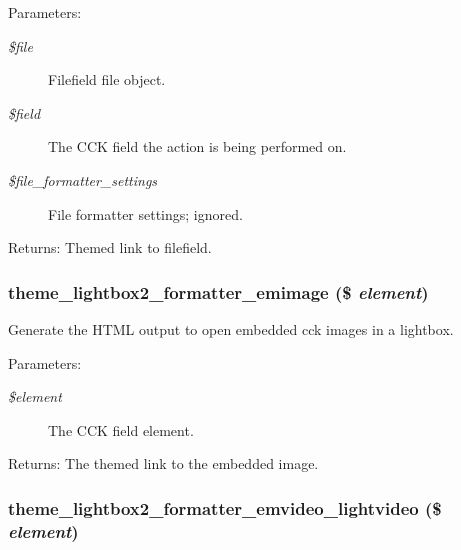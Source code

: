 \begin{Desc}
\item[Parameters:]
\begin{description}
\item[{\em \$file}]Filefield file object. \item[{\em \$field}]The CCK field the action is being performed on. \item[{\em \$file\_\-formatter\_\-settings}]File formatter settings; ignored. \end{description}
\end{Desc}
\begin{Desc}
\item[Returns:]Themed link to filefield. \end{Desc}
\hypertarget{lightbox2_8formatter_8inc_f45363655b651acac0a1a211fd1d6359}{
\subsubsection[{theme\_\-lightbox2\_\-formatter\_\-emimage}]{\setlength{\rightskip}{0pt plus 5cm}theme\_\-lightbox2\_\-formatter\_\-emimage (\$ {\em element})}}
\label{lightbox2_8formatter_8inc_f45363655b651acac0a1a211fd1d6359}


Generate the HTML output to open embedded cck images in a lightbox.

\begin{Desc}
\item[Parameters:]
\begin{description}
\item[{\em \$element}]The CCK field element. \end{description}
\end{Desc}
\begin{Desc}
\item[Returns:]The themed link to the embedded image. \end{Desc}
\hypertarget{lightbox2_8formatter_8inc_0a207276643712809de52eb7d4641b8b}{
\subsubsection[{theme\_\-lightbox2\_\-formatter\_\-emvideo\_\-lightvideo}]{\setlength{\rightskip}{0pt plus 5cm}theme\_\-lightbox2\_\-formatter\_\-emvideo\_\-lightvideo (\$ {\em element})}}
\label{lightbox2_8formatter_8inc_0a207276643712809de52eb7d4641b8b}


